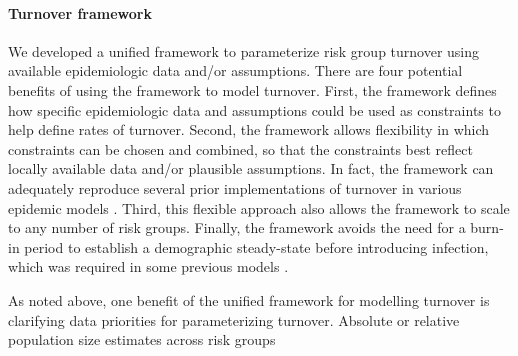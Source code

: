 \paragraph{Turnover framework}
We developed a unified framework
to parameterize risk group turnover
using available epidemiologic data and/or assumptions.
There are four potential benefits of using the framework to model turnover.
First, the framework defines how specific epidemiologic data and assumptions
could be used as constraints to help define rates of turnover.
Second, the framework allows flexibility in which constraints can be chosen and combined,
so that the constraints best reflect locally available data and/or plausible assumptions.
In fact, the framework can adequately reproduce
several prior implementations of turnover
in various epidemic models \citep{Stigum1994,Eaton2014,Henry2015}.
Third, this flexible approach also allows the framework to scale
to any number of risk groups.
Finally, the framework avoids the need for a burn-in period
to establish a demographic steady-state before introducing infection,
which was required in some previous models \citep{Boily2015}.
\par
As noted above, one benefit of the unified framework for modelling turnover
is clarifying data priorities for parameterizing turnover.
Absolute or relative population size estimates across risk groups
